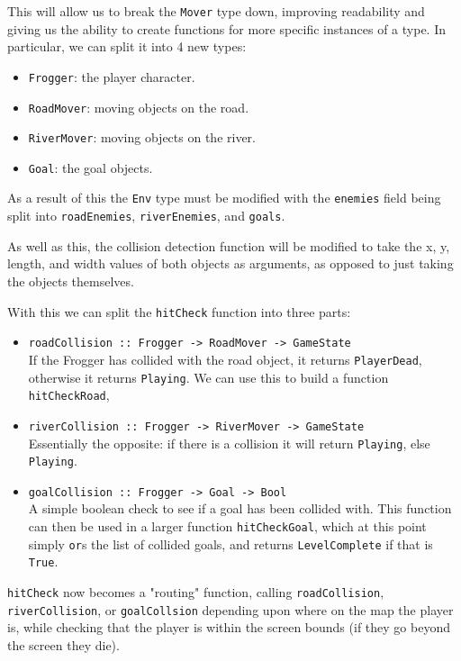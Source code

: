 \documentclass[12pt, a4paper]{report}
\begin{document}
This will allow us to break the \verb|Mover| type down, improving readability and giving us the ability to create functions for more specific instances of a type.
In particular, we can split it into 4 new types:
\begin{itemize}
  \item \verb|Frogger|: the player character.
    \item \verb|RoadMover|: moving objects on the road.
    \item \verb|RiverMover|: moving objects on the river.
    \item \verb|Goal|: the goal objects.
\end{itemize}

\par

As a result of this the \verb|Env| type must be modified with the \verb|enemies| field being split into \verb|roadEnemies|, \verb|riverEnemies|, and \verb|goals|.

As well as this, the collision detection function will be modified to take the x, y, length, and width values of both objects as arguments, as opposed to just taking the objects themselves.

\par

With this we can split the \verb|hitCheck| function into three parts:
\begin{itemize}
  \item \verb|roadCollision :: Frogger -> RoadMover -> GameState|\\
    If the Frogger has collided with the road object, it returns \verb|PlayerDead|, otherwise it returns \verb|Playing|.
    We can use this to build a function \verb|hitCheckRoad|,
  \item \verb|riverCollision :: Frogger -> RiverMover -> GameState|\\
    Essentially the opposite: if there is a collision it will return \verb|Playing|, else \verb|Playing|.
  \item \verb|goalCollision :: Frogger -> Goal -> Bool|\\
    A simple boolean check to see if a goal has been collided with.
    This function can then be used in a larger function \verb|hitCheckGoal|, which at this point simply \verb|or|s the list of collided goals, and returns \verb|LevelComplete| if that is \verb|True|.

\end{itemize}

\verb|hitCheck| now becomes a "routing" function, calling \verb|roadCollision|, \verb|riverCollision|, or \verb|goalCollsion| depending upon where on the map the player is, while checking that the player is within the screen bounds (if they go beyond the screen they die).
\end{document}
